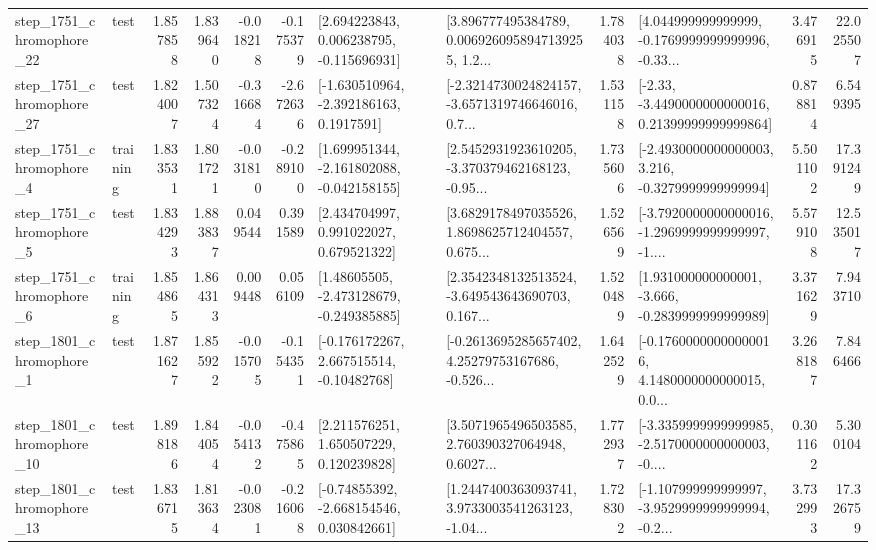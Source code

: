 \begin{tabular}{llrrrrllrlrr}
 step\_1751\_chromophore\_22 &      test &      1.857858 &    1.839640 &     -0.018218 & -0.175379 &    [2.694223843, 0.006238795, -0.115696931] &  [3.896777495384789, 0.0069260958947139255, 1.2... &       1.784038 &  [4.044999999999999, -0.1769999999999996, -0.33... &            3.476915 &         22.025507 \\
 step\_1751\_chromophore\_27 &      test &      1.824007 &    1.507324 &     -0.316684 & -2.672636 &     [-1.630510964, -2.392186163, 0.1917591] &  [-2.3214730024824157, -3.6571319746646016, 0.7... &       1.531158 &  [-2.33, -3.4490000000000016, 0.21399999999999864] &            0.878814 &          6.549395 \\
  step\_1751\_chromophore\_4 &  training &      1.833531 &    1.801721 &     -0.031810 & -0.289100 &   [1.699951344, -2.161802088, -0.042158155] &  [2.5452931923610205, -3.370379462168123, -0.95... &       1.735606 &  [-2.4930000000000003, 3.216, -0.3279999999999994] &            5.501102 &         17.391249 \\
  step\_1751\_chromophore\_5 &      test &      1.834293 &    1.883837 &      0.049544 &  0.391589 &     [2.434704997, 0.991022027, 0.679521322] &  [3.6829178497035526, 1.8698625712404557, 0.675... &       1.526569 &  [-3.7920000000000016, -1.2969999999999997, -1.... &            5.579108 &         12.535017 \\
  step\_1751\_chromophore\_6 &  training &      1.854865 &    1.864313 &      0.009448 &  0.056109 &    [1.48605505, -2.473128679, -0.249385885] &  [2.3542348132513524, -3.649543643690703, 0.167... &       1.520489 &   [1.931000000000001, -3.666, -0.2839999999999989] &            3.371629 &          7.943710 \\
  step\_1801\_chromophore\_1 &      test &      1.871627 &    1.855922 &     -0.015705 & -0.154351 &    [-0.176172267, 2.667515514, -0.10482768] &  [-0.2613695285657402, 4.25279753167686, -0.526... &       1.642529 &  [-0.17600000000000016, 4.1480000000000015, 0.0... &            3.268187 &          7.846466 \\
 step\_1801\_chromophore\_10 &      test &      1.898186 &    1.844054 &     -0.054132 & -0.475865 &     [2.211576251, 1.650507229, 0.120239828] &  [3.5071965496503585, 2.760390327064948, 0.6027... &       1.772937 &  [-3.3359999999999985, -2.5170000000000003, -0.... &            0.301162 &          5.300104 \\
 step\_1801\_chromophore\_13 &      test &      1.836715 &    1.813634 &     -0.023081 & -0.216068 &    [-0.74855392, -2.668154546, 0.030842661] &  [1.2447400363093741, 3.9733003541263123, -1.04... &       1.728302 &  [-1.107999999999997, -3.9529999999999994, -0.2... &            3.732993 &         17.326759 \\

\end{tabular}

